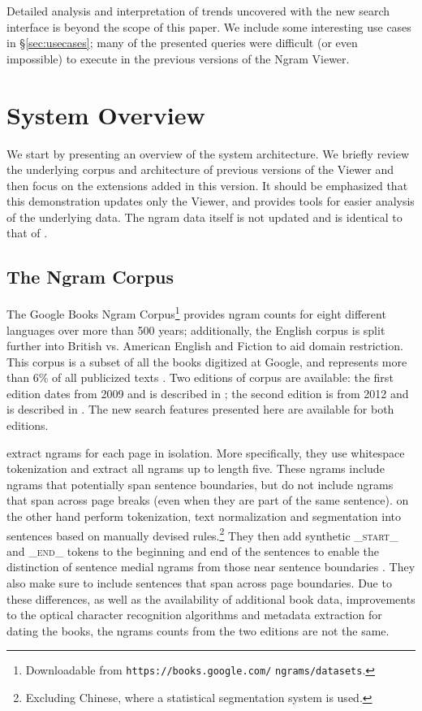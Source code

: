 \documentclass[11pt]{article}
\begin{document}
Detailed analysis and interpretation of trends uncovered with the new search interface is beyond the scope of this paper. We include some interesting use cases in \S\ref{sec:usecases}; many of the presented queries were difficult (or even impossible) to execute in the previous versions of the Ngram Viewer.

\section{System Overview}
\label{sec:overview}

We start by presenting an overview of the system architecture. We briefly review the underlying corpus and architecture of previous versions of the Viewer \cite{culturomics,lin2012syntactic} and then focus on the extensions added in this version. It should be emphasized that this demonstration updates only the Viewer, and provides tools for easier analysis of the underlying data. The ngram data itself is not updated and is identical to that of .


\subsection{The Ngram Corpus}
	The Google Books Ngram Corpus\footnote{Downloadable from \texttt{https://books.google.com/} \texttt{ngrams/datasets}.} provides ngram counts for eight different languages over more than 500 years; additionally, the English corpus is split further into British vs. American English and Fiction to aid domain restriction. This corpus is a subset of all the books digitized at Google, and represents more than 6\% of all publicized texts \cite{lin2012syntactic}. Two editions of corpus are available: the first edition dates from 2009 and is described in ; the second edition is from 2012 and is described in . The new search features presented here are available for both editions.

 extract ngrams for each page in isolation. More specifically, they use whitespace tokenization and extract all ngrams up to length five. These ngrams include ngrams that potentially span sentence boundaries, but do not include ngrams that span across page breaks (even when they are part of the same sentence).
 on the other hand perform tokenization, text normalization and segmentation into sentences based on manually devised rules.\footnote{Excluding Chinese, where a statistical segmentation system is used.} They then add synthetic \textsf{\textsc{\_start\_}} and \textsf{\textsc{\_end\_}} tokens to the beginning and end of the sentences to enable the distinction of sentence medial ngrams from those near sentence boundaries \cite{lin2012syntactic}. They also make sure to include sentences that span across page boundaries. Due to these differences, as well as the availability of additional book data, improvements to the optical character recognition algorithms and metadata extraction for dating the books, the ngrams counts from the two editions are not the same.
\end{document}

